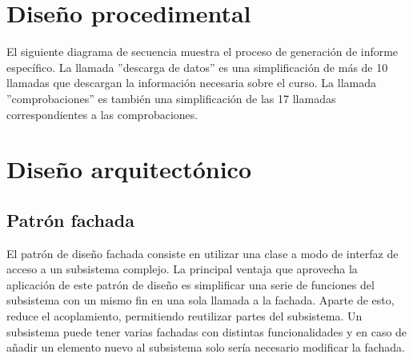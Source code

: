 \section{Diseño procedimental}
El siguiente diagrama de secuencia muestra el proceso de generación de informe específico. La llamada ''descarga de datos'' es una simplificación de más de 10 llamadas que descargan la información necesaria sobre el curso. La llamada ''comprobaciones'' es también una simplificación de las 17 llamadas correspondientes a las comprobaciones.
\section{Diseño arquitectónico}
\subsection{Patrón fachada}
El patrón de diseño fachada consiste en utilizar una clase a modo de interfaz de acceso a un subsistema complejo. La principal ventaja que aprovecha la aplicación de este patrón de diseño es simplificar una serie de funciones del subsistema con un mismo fin en una sola llamada a la fachada. Aparte de esto, reduce el acoplamiento, permitiendo reutilizar partes del subsistema. Un subsistema puede tener varias fachadas con distintas funcionalidades y en caso de añadir un elemento nuevo al subsistema solo sería necesario modificar la fachada.
